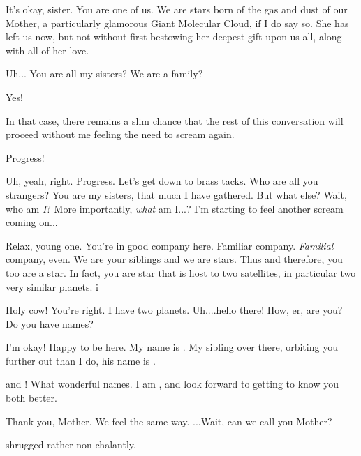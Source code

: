 \documentclass[main.tex]{subfiles}
\begin{document}
\par \Maia It's okay, sister.  You are one of us.  We are stars born of the gas and dust of our Mother, a particularly glamorous Giant Molecular Cloud, if I do say so.  She has left us now, but not without first bestowing her deepest gift upon us all, along with all of her love.

\par \Sterope  Uh... You are all my sisters?  We are a family?

\par \Maia Yes!

\par \Sterope  In that case, there remains a slim chance that the rest of this conversation will proceed without me feeling the need to scream again.

\par \Maia Progress!

\par \Sterope Uh, yeah, right.  Progress.  Let's get down to brass tacks.  Who are all you strangers?  You are my sisters, that much I have gathered.  But what else?  Wait, who am \textit{I}?  More importantly, \textit{what} am I...?  I'm starting to feel another scream coming on...

\par \Maia Relax, young one.  You're in good company here.  Familiar company.  \textit{Familial} company, even. We are your siblings and we are stars.  Thus and therefore, you too are a star.  In fact, you are star that is host to two satellites, in particular two very similar planets. i

\par \Sterope Holy cow!  You're right.  I have two planets.  Uh....hello there!  How, er, are you?  Do you have names?

\par \Alphab I'm okay!  Happy to be here.  My name is \rmalpha.  My sibling over there, orbiting you further out than I do, his name is \rmbeta.

\par \Sterope \rmalpha and \rmbeta!  What wonderful names.  I am \rmsterope, and look forward to getting to know you both better.

\par \Betab Thank you, Mother.  We feel the same way. ...Wait, can we call you Mother?

\par \nar \rmsterope shrugged rather non-chalantly.
\end{document}
